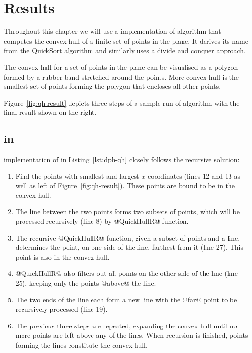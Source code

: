 \documentclass[preamble.tex]{subfiles}
\begin{document}
\clearpage

\chapter{Results}
\label{ch:results}
\label{sec:QuickHull}

Throughout this chapter we will use a  implementation of \QuickHull algorithm that computes the convex hull of a finite set of points in the plane. It derives its name from the QuickSort algorithm and similarly uses a divide and conquer approach.

The convex hull for a set of points in the plane can be visualised as a polygon formed by a rubber band stretched around the points. More convex hull is the smallest set of points forming the polygon that encloses all other points.

Figure~\ref{fig:qh-result} depicts three steps of a sample run of \QuickHull algorithm with the final result shown on the right.


\section{\QuickHull in \DPH}

 implementation of \QuickHull in Listing~\ref{lst:dph-qh} closely follows the recursive solution:
\begin{enumerate}
  \item Find the points with smallest and largest $x$ coordinates (lines 12 and 13 as well as left of Figure~\ref{fig:qh-result}). These points are bound to be in the convex hull.

  \item The line between the two points forms two subsets of points, which will be processed recursively (line 8) by @QuickHullR@ function.

  \item The recursive @QuickHullR@ function, given a subset of points and a line, determines the point, on one side of the line, farthest from it (line 27). This point is also in the convex hull.

  \item @QuickHullR@ also filters out all points on the other side of the line (line 25), keeping only the points @above@ the line.

  \item The two ends of the line each form a new line with the @far@ point to be recursively processed (line 19).

  \item The previous three steps are repeated, expanding the convex hull until no more points are left above any of the lines. When recursion is finished, points forming the lines constitute the convex hull.
\end{enumerate}
\end{document}
